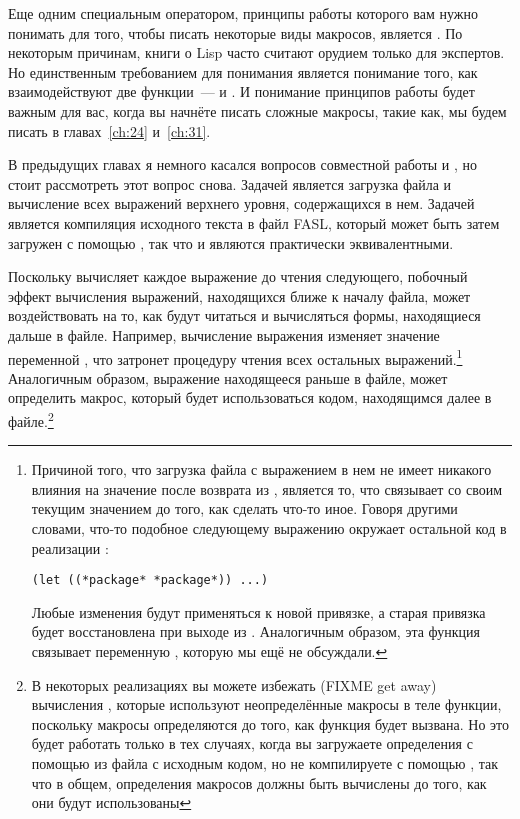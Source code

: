 Еще одним специальным оператором, принципы работы которого вам нужно понимать для того,
чтобы писать некоторые виды макросов, является .  По некоторым причинам,
книги о Lisp часто считают  орудием только для экспертов.  Но единственным
требованием для понимания  является понимание того, как взаимодействуют
две функции~---  и .  И понимание принципов работы
 будет важным для вас, когда вы начнёте писать сложные макросы, такие как,
мы будем писать в главах~\ref{ch:24} и~\ref{ch:31}.

В предыдущих главах я немного касался вопросов совместной работы  и
, но стоит рассмотреть этот вопрос снова.  Задачей  является
загрузка файла и вычисление всех выражений верхнего уровня, содержащихся в нем.  Задачей
 является компиляция исходного текста в файл FASL, который может быть
затем загружен с помощью , так что  и  являются практически эквивалентными.

Поскольку  вычисляет каждое выражение до чтения следующего, побочный эффект
вычисления выражений, находящихся ближе к началу файла, может воздействовать на то, как
будут читаться и вычисляться формы, находящиеся дальше в файле.  Например, вычисление
выражения  изменяет значение переменной , что затронет
процедуру чтения всех остальных выражений.\footnote{Причиной того, что загрузка файла с
  выражением  в нем не имеет никакого влияния на значение
   после возврата из , является то, что  связывает
   со своим текущим значением до того, как сделать что-то иное.  Говоря
  другими словами, что-то подобное следующему выражению  окружает остальной код
  в реализации :

\begin{lstlisting}
(let ((*package* *package*)) ...)
\end{lstlisting}

Любые изменения  будут применяться к новой привязке, а старая привязка
будет восстановлена при выходе из .  Аналогичным образом, эта функция связывает
переменную , которую мы ещё не обсуждали.}  Аналогичным образом,
выражение  находящееся раньше в файле, может определить макрос, который
будет использоваться кодом, находящимся далее в файле.\footnote{В некоторых реализациях вы
  можете избежать (FIXME get away) вычисления , которые используют
  неопределённые макросы в теле функции, поскольку макросы определяются до того, как
  функция будет вызвана.  Но это будет работать только в тех случаях, когда вы загружаете
  определения с помощью  из файла с исходным кодом, но не компилируете с
  помощью , так что в общем, определения макросов должны быть вычислены
  до того, как они будут использованы}

